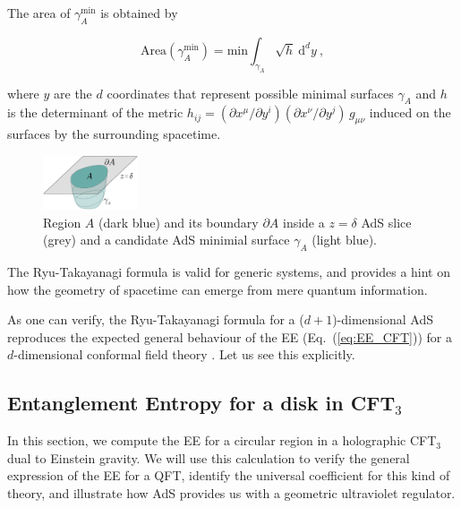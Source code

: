 \documentclass[twocolumn]{revtex4}
\providecommand{\eq}[2]{
    \begin{equation}
        #2
    \label{eq:#1}
    \end{equation}
}
\begin{document}
The area of $\gamma_A^\text{min}$ is obtained by
\eq{EE_RT-area}{
    \text{Area}(\gamma_A^\text{min}) ={\text{min}} \int_{\gamma_A} \sqrt{h} \ \mathrm{d}^{d}y \ ,
}
where $y$ are the $d$ coordinates that represent possible minimal surfaces $\gamma_A$ and $h$ is the determinant of the metric $h_{ij} = (\partial x^\mu / \partial y^i) (\partial x^\nu / \partial y^j) \, g_{\mu\nu}$ induced on the surfaces by the surrounding spacetime.

\begin{figure}
    \centering
    \includegraphics[width=0.25\textwidth]{../../../Imatges/EE_AdS-CFT-D.png}
\caption{Region $A$ (dark blue) and its boundary $\partial A$ inside a $z=\delta$ AdS slice (grey) and a candidate AdS minimial surface $\gamma_A$ (light blue).}
\label{fig:EE_AdS-CFT}
\end{figure}

The Ryu-Takayanagi formula is valid for generic systems, and provides a hint on how the geometry of spacetime can emerge from mere quantum information.

As one can verify, the Ryu-Takayanagi formula for a ($d+1$)-dimensional AdS reproduces the expected general behaviour of the EE (Eq.~(\ref{eq:EE_CFT})) for a $d$-dimensional conformal field theory \cite{ryu_aspects_2006, nishioka_holographic_2009}. Let us see this explicitly.


\subsection{Entanglement Entropy for a disk in CFT\texorpdfstring{$_3$}{3}} \label{ss:EE-disk}

In this section, we compute the EE for a circular region in a holographic CFT$_3$ dual to Einstein gravity. We will use this calculation to verify the general expression of the EE for a QFT, identify the universal coefficient for this kind of theory, and illustrate how AdS provides us with a geometric ultraviolet regulator.
\end{document}
